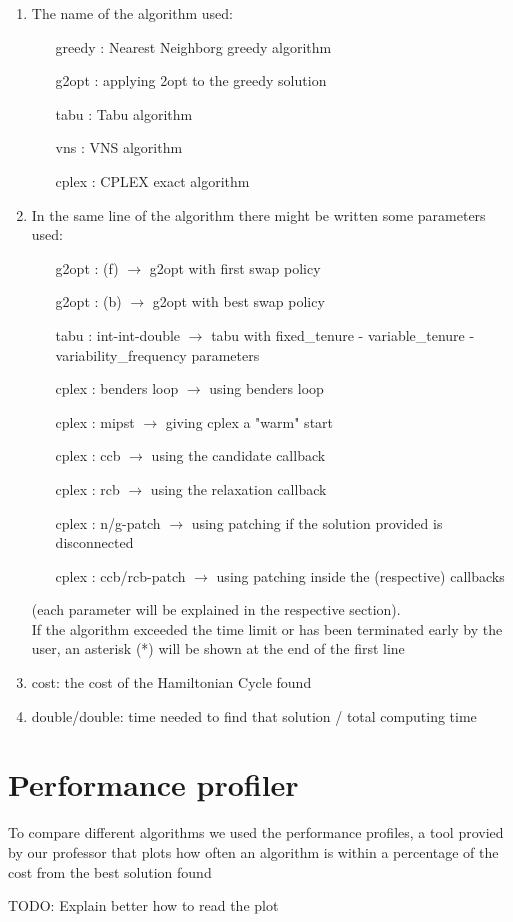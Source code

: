 \begin{enumerate}
    \item The name of the algorithm used:
    \begin{enumerate}
        \item[greedy]: Nearest Neighborg greedy algorithm
        \item[g2opt]: applying 2opt to the greedy solution
        \item[tabu]: Tabu algorithm
        \item[vns]: VNS algorithm
        \item[cplex]: CPLEX exact algorithm
    \end{enumerate}
    \item In the same line of the algorithm there might be written some parameters used:
    \begin{enumerate}
        \item[g2opt]: (f) $\rightarrow$ g2opt with first swap policy
        \item[g2opt]: (b) $\rightarrow$ g2opt with best swap policy
        \item[tabu]: int-int-double $\rightarrow$ tabu with fixed\_tenure - variable\_tenure - variability\_frequency parameters
        \item[cplex]: benders loop $\rightarrow$ using benders loop
        \item[cplex]: mipst $\rightarrow$ giving cplex a "warm" start
        \item[cplex]: ccb $\rightarrow$ using the candidate callback
        \item[cplex]: rcb $\rightarrow$ using the relaxation callback
        \item[cplex]: n/g-patch $\rightarrow$ using patching if the solution provided is disconnected
        \item[cplex]: ccb/rcb-patch $\rightarrow$ using patching inside the (respective) callbacks
    \end{enumerate}
    (each parameter will be explained in the respective section).\\
    If the algorithm exceeded the time limit or has been terminated early by the user, an asterisk (*) will be shown at the end of the first line
    \item cost: the cost of the Hamiltonian Cycle found
    \item double/double: time needed to find that solution / total computing time
\end{enumerate}

\section{Performance profiler}

To compare different algorithms we used the performance profiles, a tool provied by our professor that plots how often an algorithm is within a percentage of the cost from the best solution found

TODO: Explain better how to read the plot
